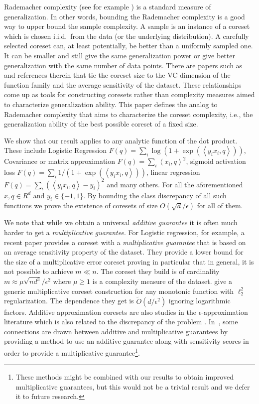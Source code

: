 \documentclass[12pt]{colt2019} %
\newcommand{\ip}[1]{\left \langle #1 \right \rangle}
\newcommand{\eps}{\epsilon}
\begin{document}
Rademacher complexity (see for example \cite{Bartlett:2003:RGC:944919.944944}) is a standard measure of generalization.
In other words, bounding the Rademacher complexity is a good way to upper bound the sample complexity. 
A sample is an instance of a coreset which is chosen i.i.d.\ from the data (or the underlying distribution).
A carefully selected coreset can, at least potentially, be better than a uniformly sampled one. 
It can be smaller and still give the same generalization power or give better generalization with the same number of data points. 
There are papers such as \cite{langberg2010universal, tolochinsky2018coresets} and references therein that tie the coreset size to the VC dimension of the function family and the average sensitivity of the dataset. 
These relationships come up as tools for constructing coresets rather than complexity measures aimed to characterize generalization ability. 
This paper defines the analog to Rademacher complexity that aims to characterize the coreset complexity, i.e., the generalization ability of the best possible coreset of a fixed size.
 
We show that our result applies to any analytic function of the dot product. 
These include Logistic Regression $F(q) =  \sum_i \log(1+\exp(\ip{y_ix_i,q}))$, Covariance or matrix approximation 
$F(q) =  \sum_i \ip{x_i,q}^2$, sigmoid activation loss $F(q) =  \sum_i 1/(1+\exp(\ip{y_ix_i,q}))$, linear regression $F(q) =  \sum_i (\ip{y_ix_i,q} -y_i)^2$ and many others. 
For all the aforementioned  $x,q \in R^d$ and $y_i \in \{-1,1\}$.
By bounding the class discrepancy of all such functions we prove the existence of coresets of size $O(\sqrt{d}/\eps)$ for all of them.

We note that while we obtain a universal {\it additive guarantee} it is often much harder to get a  {\it multiplicative guarantee}.
For Logistic regression, for example, a recent paper \cite{DBLP:journals/corr/abs-1805-08571} provides a coreset with a  {\it multiplicative guarantee} that is based on an average sensitivity property of the dataset. 
They provide a lower bound for the size of a multiplicative error coreset proving in particular that in general, it is not possible to achieve $m \ll n$. 
The coreset they build is of cardinality $m \approx \mu\sqrt{nd^3}/\eps^2$ where $\mu \geq 1$ is a complexity measure of the dataset.  
\cite{tolochinsky2018coresets} give a generic multiplicative coreset construction for any monotonic function with $\ell_2^2$ regularization. 
The dependence they get is $\tilde O(d/\eps^2)$ ignoring logarithmic factors. 
Additive approximation coresets are also studies in the $\eps$-approximation literature which is also related to the discrepancy of the problem \cite{DBLP:journals/corr/MustafaV17}. In~\cite{braverman2016new}, some connections are drawn between additive and multiplicative guarantees by providing a method to use an additive guarantee along with sensitivity scores in order to provide a multiplicative guarantee\footnote{These methods might be combined with our results to obtain improved multiplicative guarantees, but this would not be a trivial result and we defer it to future research.}.
\end{document}

